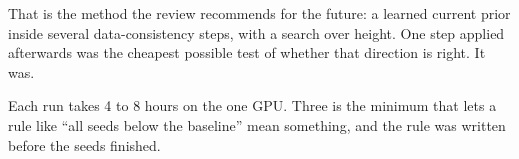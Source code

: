 \begin{defend}
That is the method the review recommends for the future: a learned current prior inside several data-consistency
steps, with a search over height. One step applied afterwards was the cheapest possible test of whether that direction
is right. It was.
\end{defend}

\begin{defend}
Each run takes 4 to 8 hours on the one GPU. Three is the minimum that lets a rule like ``all seeds below the
baseline'' mean something, and the rule was written before the seeds finished.
\end{defend}
